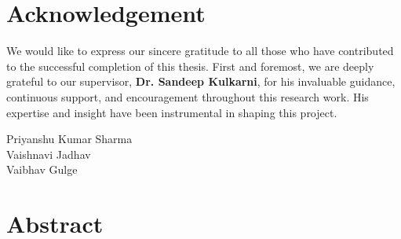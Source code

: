\chapter*{Acknowledgement}

We would like to express our sincere gratitude to all those who have contributed to the successful completion of this thesis. First and foremost, we are deeply grateful to our supervisor, \textbf{Dr. Sandeep Kulkarni}, for his invaluable guidance, continuous support, and encouragement throughout this research work. His expertise and insight have been instrumental in shaping this project. 

\vspace{3cm}

\begin{flushright}
Priyanshu Kumar Sharma \\ Vaishnavi Jadhav \\ Vaibhav Gulge
\end{flushright}

\newpage

\chapter*{Abstract}
\thispagestyle{plain}

